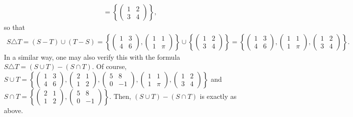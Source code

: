 \documentclass[12pt]{article}
\numberwithin{theorem}{section}
\numberwithin{equation}{section}
\numberwithin{remark}{section}
\numberwithin{definition}{section}
\numberwithin{theorem}{section}
\numberwithin{lemma}{section}
\numberwithin{example}{section}
\begin{document}
\begin{itemize}
{\begin{align*}
			& = \left\{\begin{pmatrix} 1 & 2 \\ 3 & 4 \end{pmatrix}\right\},
		\end{align*}
		so that 
		\begin{align*}
			S\triangle T = \left(S - T\right) \cup \left(T - S\right) = \left\{\begin{pmatrix} 1 & 3 \\ 4 & 6 \end{pmatrix}, \begin{pmatrix} 1 & 1 \\ 1 & \pi \end{pmatrix}\right\} \cup \left\{\begin{pmatrix} 1 & 2 \\ 3 & 4 \end{pmatrix}\right\} = \left\{\begin{pmatrix} 1 & 3 \\ 4 & 6 \end{pmatrix}, \begin{pmatrix} 1 & 1 \\ 1 & \pi \end{pmatrix}, \begin{pmatrix} 1 & 2 \\ 3 & 4 \end{pmatrix}\right\}.
		\end{align*}
		In a similar way, one may also verify this with the formula $S\triangle T = \left(S\cup T\right) - \left(S\cap T\right)$. Of course, $S\cup T = \left\{\begin{pmatrix} 1 & 3 \\ 4 & 6 \end{pmatrix}, \begin{pmatrix} 2 & 1 \\ 1 & 2 \end{pmatrix}, \begin{pmatrix} 5 & 8 \\ 0 & -1 \end{pmatrix}, \begin{pmatrix} 1 & 1 \\ 1 & \pi \end{pmatrix}, \begin{pmatrix} 1 & 2 \\ 3 & 4 \end{pmatrix}\right\}$ and $S\cap T = \left\{\begin{pmatrix} 2 & 1 \\ 1 & 2 \end{pmatrix}, \begin{pmatrix} 5 & 8 \\ 0 & -1 \end{pmatrix}\right\}$. Then, $\left(S\cup T\right) - \left(S\cap T\right)$ is exactly as above. }
\end{itemize}
\end{document}
